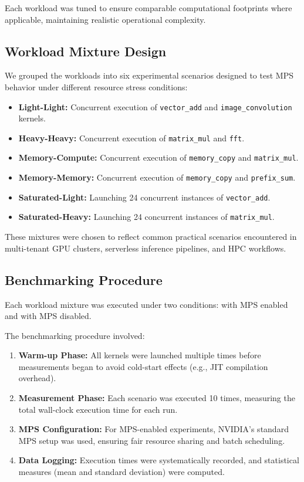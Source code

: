 \documentclass[sigconf,nonacm]{acmart}
\begin{document}
Each workload was tuned to ensure comparable computational footprints where applicable, maintaining realistic operational complexity.

\subsection{Workload Mixture Design}

We grouped the workloads into six experimental scenarios designed to test MPS behavior under different resource stress conditions:

\begin{itemize}
    \item \textbf{Light-Light:} Concurrent execution of \texttt{vector\_add} and 
    \newline
    \texttt{image\_convolution} kernels.
    \item \textbf{Heavy-Heavy:} Concurrent execution of \texttt{matrix\_mul} and \texttt{fft}.
    \item \textbf{Memory-Compute:} Concurrent execution of \texttt{memory\_copy} and \texttt{matrix\_mul}.
    \item \textbf{Memory-Memory:} Concurrent execution of \texttt{memory\_copy} and \texttt{prefix\_sum}.
    \item \textbf{Saturated-Light:} Launching 24 concurrent instances of \texttt{vector\_add}.
    \item \textbf{Saturated-Heavy:} Launching 24 concurrent instances of \texttt{matrix\_mul}.
\end{itemize}

These mixtures were chosen to reflect common practical scenarios encountered in multi-tenant GPU clusters, serverless inference pipelines, and HPC workflows.

\subsection{Benchmarking Procedure}

Each workload mixture was executed under two conditions: with MPS enabled and with MPS disabled.

The benchmarking procedure involved:

\begin{enumerate}
    \item \textbf{Warm-up Phase:} All kernels were launched multiple times before measurements began to avoid cold-start effects (e.g., JIT compilation overhead).
    \item \textbf{Measurement Phase:} Each scenario was executed 10 times, measuring the total wall-clock execution time for each run.
    \item \textbf{MPS Configuration:} For MPS-enabled experiments, NVIDIA's standard MPS setup was used, ensuring fair resource sharing and batch scheduling.
    \item \textbf{Data Logging:} Execution times were systematically recorded, and statistical measures (mean and standard deviation) were computed.
\end{enumerate}
\end{document}
